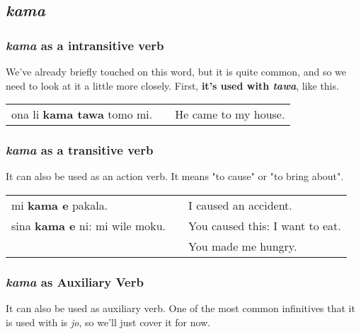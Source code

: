 %
{}
\subsection*{\textit{kama}}
\subsubsection*{\textit{kama} as a intransitive verb}
%
We've already briefly touched on this word, but it is quite common, and so we need to look at it a little more closely. 
First, \textbf{it's used with \textit{tawa}}, like this.

\begin{supertabular}{p{5,5cm}|ll}
ona li \textbf{kama tawa} tomo mi. && He came to my house. \\
\end{supertabular} 
%
\subsubsection*{\textit{kama} as a transitive verb}
%
It can also be used as an action verb. 
It means "to cause" or "to bring about".

\begin{supertabular}{p{5,5cm}|ll}
mi \textbf{kama e} pakala. && I caused an accident. \\
sina \textbf{kama e} ni: mi wile moku. && You caused this: I want to eat. \\ && You made me hungry. \\
\end{supertabular} 
%
\subsubsection*{\textit{kama} as Auxiliary Verb}
%
It can also be used as auxiliary verb. 
One of the most common infinitives that it is used with is \textit{jo}, so we'll just cover it for now. 

